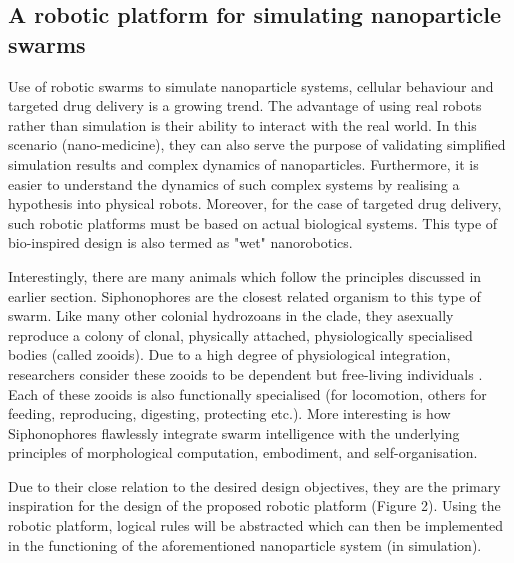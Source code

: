 \documentclass[11pt,a4paper]{article}
\begin{document}
\begin{multicols}{2}
\subsection{A robotic platform for simulating nanoparticle swarms}\label{gen}
Use of robotic swarms to simulate nanoparticle systems, cellular behaviour and targeted drug delivery is a growing trend. The advantage of using real robots rather than simulation is their ability to interact with the real world. In this scenario (nano-medicine), they can also serve the purpose of validating simplified simulation results and complex dynamics of nanoparticles. Furthermore, it is easier to understand the dynamics of such complex systems by realising a hypothesis into physical robots. Moreover, for the case of targeted drug delivery, such robotic platforms must be based on actual biological systems. This type of bio-inspired design is also termed as "wet" nanorobotics\cite{singh2008nanotechnology}. 

Interestingly, there are many animals which follow the principles discussed in earlier section. Siphonophores are the closest related organism to this type of swarm. Like many other colonial hydrozoans in the clade, they asexually reproduce a colony of clonal, physically attached, physiologically specialised bodies (called zooids). Due to a high degree of physiological integration, researchers consider these zooids to be dependent but free-living individuals \cite{mills1995medusae}. Each of these zooids is also functionally specialised (for locomotion, others for feeding, reproducing, digesting, protecting etc.). More interesting is how Siphonophores flawlessly integrate swarm intelligence with the underlying principles of morphological computation, embodiment, and self-organisation. 

Due to their close relation to the desired design objectives, they are the primary inspiration for the design of the proposed robotic platform (Figure 2). Using the robotic platform, logical rules will be abstracted which can then be implemented in the functioning of the aforementioned nanoparticle system (in simulation).
\end{multicols}


\newpage
\end{document}
